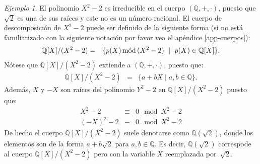 \documentclass[10pt]{article}
\newcommand{\0}{\mathbf{0}}
\newcommand{\1}{\mathbf{1}}
\newcommand{\modl}{\mod}
\newcommand{\mods}{\,\text{\rm mód}\,}
\newcommand{\+}{\oplus}
\theoremstyle{remark}
\newtheorem{example}[theorem]{Ejemplo}
\theoremstyle{remark}
\begin{document}
\begin{example}\label{exa-cuerpo-desc}
El polinomio $X^2-2$ es irreducible en el cuerpo
$(\mathbb{Q},+,\cdot)$, puesto que $\sqrt{2}$ es una de sus raíces y
este no es un número racional. El cuerpo de descomposición de $X^2-2$
puede ser definido de la siguiente forma (si no está familiarizado con
la siguiente notación por favor vea el apéndice \ref{app-cuerpos}):
\begin{eqnarray*}
  \mathbb{Q}[X]/(X^2-2) & = & \{p(X) \mods (X^2-2)  \ \mid \  p(X)\in \mathbb{Q}[X]\}.
\end{eqnarray*}
Nótese que $\mathbb{Q}[X]/(X^2-2)$ extiende a $(\mathbb{Q},+,\cdot)$, puesto que:
\begin{eqnarray*}
  \mathbb{Q}[X]/(X^2-2) & = & \{a+bX  \mid  a,b \in \mathbb{Q}\}.
\end{eqnarray*}
Además, $X$ y $-X$ son raíces del polinomio $Y^2-2$ en $\mathbb{Q}[X]/(X^2-2)$ puesto que:
\begin{eqnarray*}
  X^2 - 2 & \equiv & 0 \modl X^2 - 2\\
  (-X)^2 - 2 & \equiv & 0 \modl X^2 - 2
\end{eqnarray*}
De hecho el cuerpo $\mathbb{Q}[X]/(X^2-2)$ suele denotarse como
$\mathbb{Q}(\sqrt{2})$, donde los elementos son de la forma $a +
b\sqrt{2}$ para $a,b \in \mathbb{Q}$. Es decir, $\mathbb{Q}(\sqrt{2})$
correspode al cuerpo $\mathbb{Q}[X]/(X^2-2)$ pero con la variable $X$
reemplazada por~$\sqrt{2}$.


\end{example}
\end{document}
